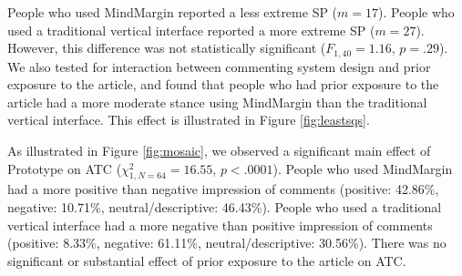 People who used MindMargin reported a less extreme SP ($m=17$). People who used a traditional vertical interface reported a more extreme SP ($m=27$). However, this difference was not statistically significant ($F_{1,40}=1.16$, $p=.29$). We also tested for interaction between commenting system design and prior exposure to the article, and found that people who had prior exposure to the article had a more moderate stance using MindMargin than the traditional vertical interface. This effect is illustrated in Figure \ref{fig:leastsqs}. 




As illustrated in Figure \ref{fig:mosaic}, we observed a significant main effect of Prototype on ATC ($\chi^2_{1,N=64}=16.55$, $p<.0001$).
People who used MindMargin had a more positive than negative impression of comments (positive: 42.86\%, negative: 10.71\%, neutral/descriptive: 46.43\%). People who used a traditional vertical interface had a more negative than positive impression of comments (positive: 8.33\%, negative: 61.11\%, neutral/descriptive: 30.56\%). There was no significant or substantial effect of prior exposure to the article on ATC.  %

